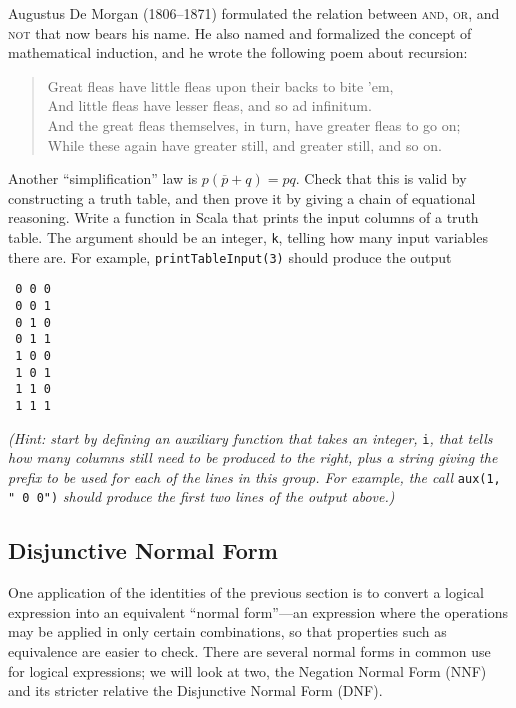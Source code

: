 \begin{tailquote}
Augustus De Morgan (1806--1871) formulated the relation between \textsc{and}, \textsc{or}, and \textsc{not} that now bears his name. He also named and formalized the concept of mathematical induction, and he wrote the following poem about recursion:
\begin{verse}
Great fleas have little fleas upon their backs to bite 'em,\\
And little fleas have lesser fleas, and so ad infinitum.\\
And the great fleas themselves, in turn, have greater fleas to go on;\\
While these again have greater still, and greater still, and so on.
\end{verse}
\end{tailquote}

\begin{exercises}
\problem Another ``simplification'' law is $p(\overline{p}+q) = pq$. Check that this is valid by constructing a truth table, and then prove it by giving a chain of equational reasoning.
\problem Write a function in Scala that prints the input columns of a truth table. The argument should be an integer, \verb|k|, telling how many input variables there are. For example, \verb|printTableInput(3)| should produce the output
\begin{verbatim}
 0 0 0
 0 0 1
 0 1 0
 0 1 1
 1 0 0
 1 0 1
 1 1 0
 1 1 1
\end{verbatim}
\textit{(Hint: start by defining an auxiliary function that takes an integer,} \verb|i|\textit{, that tells how many columns still need to be produced to the right, plus a string giving the prefix to be used for each of the lines in this group. For example, the call} \verb|aux(1, " 0 0")| \textit{should produce the first two lines of the output above.)}
\end{exercises}

\subsection{Disjunctive Normal Form}\label{ssec:DNF}
One application of the identities of the previous section is to convert a logical expression into an equivalent ``normal form''---an expression where the operations may be applied in only certain combinations, so that properties such as equivalence are easier to check. There are several normal forms in common use for logical expressions; we will look at two, the Negation Normal Form (NNF) and its stricter relative the Disjunctive Normal Form (DNF).


